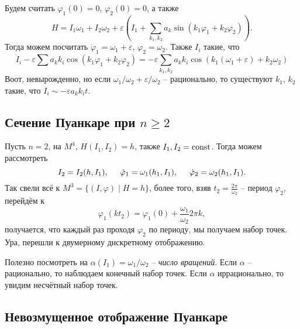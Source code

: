 Будем считать $\varphi_1 (0) = 0$, $\varphi_2 (0) = 0$, а также
\begin{equation*}
    H = I_1 \omega_1 + I_2 \omega_2 + \varepsilon (I_1 + \sum_{k_1, k_2} a_k \sin(k_1 \varphi_1 + k_2 \varphi_2)).
\end{equation*}
Тогда можем посчитать $\dot{\varphi}_1 = \omega_1 + \varepsilon$, $\varphi_2 = \omega_2$. Также $I_i$ такие, что
\begin{equation*}
    \dot{I}_i - \varepsilon \sum a_k k_i \cos(k_1 \varphi_1 + k_2 \varphi_2) = - \varepsilon \sum_{k_1, k_2} a_k k_i \cos (k_1 (\omega_1 + \varepsilon) + k_2 \omega_2)
\end{equation*}
Воот, невырожденно, но если $\omega_1/\omega_2 + \varepsilon/\omega_2$ -- рационально, то существуют $k_1$, $k_2$ такие, что  $I_i \sim - \varepsilon a_k k_i t$.



\subsection{Сечение Пуанкаре при \texorpdfstring{$n \geq 2$}{}}

Пусть $n=2$, на $M^4$, $H(I_1, I_2) = h$, также $I_1, I_2 = \text{const}$. Тогда можем рассмотреть
\begin{equation*}
    I_2 = I_2 (h, I_1), \hspace{5 mm}
    \dot{\varphi}_1 = \omega_1 (h_1, I_1),
    \hspace{5 mm}
    \dot{\varphi}_2 = \omega_2 (h_1, I_1).
\end{equation*}
Так свели всё к $M^3 =\{(I, \varphi) \mid H = h\}$,  более того, взяв $t_2 = \frac{2\pi}{\omega_2}$ -- период $\varphi_2$, перейдём к 
\begin{equation*}
    \varphi_1 (k t_2) = \varphi_1 (0) + \frac{\omega_1}{\omega_2} 2 \pi k,
\end{equation*}
получается, что каждый раз проходя $\varphi_2$ по периоду, мы получаем набор точек. Ура, перешли к двумерному дискретному отображению.

Полезно посмотреть на $\alpha(I_1) = \omega_1/\omega_2$ -- \textit{число вращений}. Если $\alpha$ -- рационально, то наблюдаем конечный набор точек. Если $\alpha$ иррационально, то увидим несчётный набор точек.


\subsection{Невозмущенное отображение Пуанкаре}

